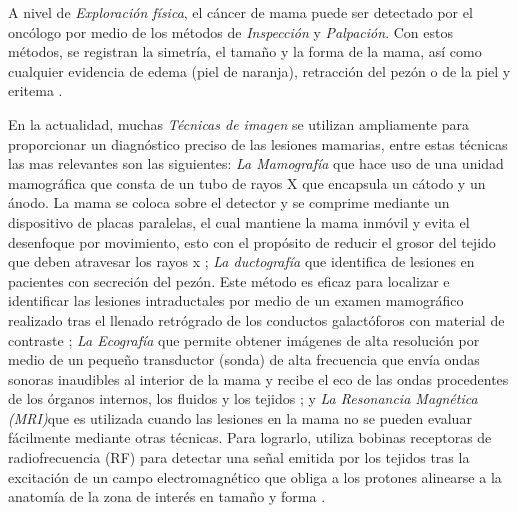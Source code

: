 A nivel de \textit{Exploración física}, el cáncer de mama puede ser detectado por el oncólogo por medio de los métodos de \textit{Inspección} y \textit{Palpación}. Con estos métodos, se registran la simetría, el tamaño y la forma de la mama, así como cualquier evidencia de edema (piel de naranja), retracción del pezón o de la piel y eritema .

En la actualidad, muchas \textit{Técnicas de imagen} se utilizan ampliamente para proporcionar un diagnóstico preciso de las lesiones mamarias\cite{Tamam2021}, entre estas técnicas las mas relevantes son las siguientes: \textit{La Mamografía} que hace uso de una unidad mamográfica que consta de un tubo de rayos X que encapsula un cátodo y un ánodo. La mama se coloca sobre el detector y se comprime mediante un dispositivo de placas paralelas, el cual mantiene la mama inmóvil y evita el desenfoque por movimiento, esto con el propósito de reducir el grosor del tejido que deben atravesar los rayos x \cite{Ebrahimi2019}; \textit{La ductografía} que identifica de lesiones en pacientes con secreción del pezón. Este método es eficaz para localizar e identificar las lesiones intraductales por medio de un examen mamográfico realizado tras el llenado retrógrado de los conductos galactóforos con material de contraste \cite{Hirose2007}; \textit{La Ecografía} que permite obtener imágenes de alta resolución por medio de un pequeño transductor (sonda) de alta frecuencia que envía ondas sonoras inaudibles al interior de la mama y recibe el eco de las ondas procedentes de los órganos internos, los fluidos y los tejidos \cite{Hasan2019}; y \textit{La Resonancia Magnética (MRI)}que es utilizada cuando las lesiones en la mama no se pueden evaluar fácilmente mediante otras técnicas. Para lograrlo, utiliza bobinas receptoras de radiofrecuencia (RF) para detectar una señal emitida por los tejidos tras la excitación de un campo electromagnético que obliga a los protones alinearse a la anatomía de la zona de interés en tamaño y forma \cite{Tse2014}.


